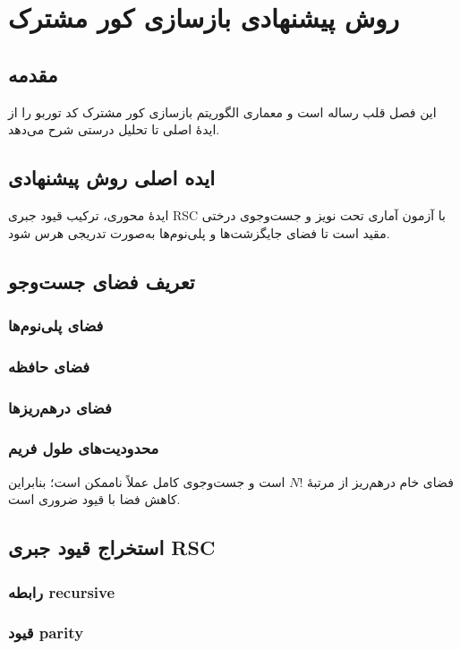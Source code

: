 \chapter{روش پیشنهادی بازسازی کور مشترک}
\label{chap:proposed-method}

\section{مقدمه}
این فصل قلب رساله است و معماری الگوریتم بازسازی کور مشترک کد توربو را از ایدهٔ اصلی تا تحلیل درستی شرح می‌دهد.

\section{ایده اصلی روش پیشنهادی}
ایدهٔ محوری، ترکیب قیود جبری RSC با آزمون آماری تحت نویز و جست‌وجوی درختی مقید است تا فضای جایگزشت‌ها و پلی‌نوم‌ها به‌صورت تدریجی هرس شود.

\section{تعریف فضای جست‌وجو}
\subsection{فضای پلی‌نوم‌ها}
\subsection{فضای حافظه}
\subsection{فضای درهم‌ریزها}
\subsection{محدودیت‌های طول فریم}
فضای خام درهم‌ریز از مرتبهٔ \(N!\) است و جست‌وجوی کامل عملاً ناممکن است؛ بنابراین کاهش فضا با قیود ضروری است.

\section{استخراج قیود جبری RSC}
\subsection{رابطه recursive}
\subsection{قیود parity}
